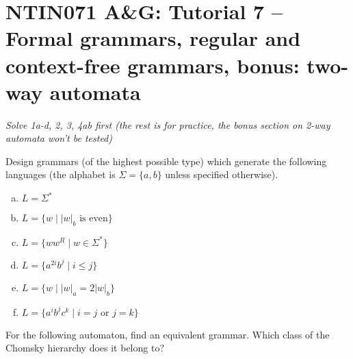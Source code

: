 \documentclass[a4paper,12pt]{amsart}
\begin{document}

\section*{NTIN071 A\&G: Tutorial 7 -- Formal grammars, regular and context-free grammars, bonus: two-way automata}


\medskip

\noindent\emph{Solve 1a-d, 2, 3, 4ab first (the rest is for practice, the bonus section on 2-way automata won't be tested)}

\medskip


\medskip\begin{problem}

    Design grammars (of the highest possible type) which generate the following languages (the alphabet is $\Sigma=\{a,b\}$ unless specified otherwise).
    
    \begin{multicols}{2}
    \begin{enumerate}[(a)]    
        \item $L=\Sigma^*$
        \item $L=\{w\mid |w|_b\text{ is even}\} $
        \item $L=\{ww^R\mid w\in \Sigma^*\} $
        \item $L=\{a^{2i}b^j\mid i\leq j\}$
        \item $L=\{w\mid |w|_a = 2|w|_b\}$
        \item $L = \{a^ib^jc^k\mid i = j\text{ or }j = k\}$    
    \end{enumerate}
    \end{multicols}

\end{problem}


\medskip\begin{problem}[FA to grammar]

    For the following automaton, find an equivalent grammar. Which class of the Chomsky hierarchy does it belong to?
    
    \begin{center}
    \end{center}
        
\end{problem}
\end{document}

